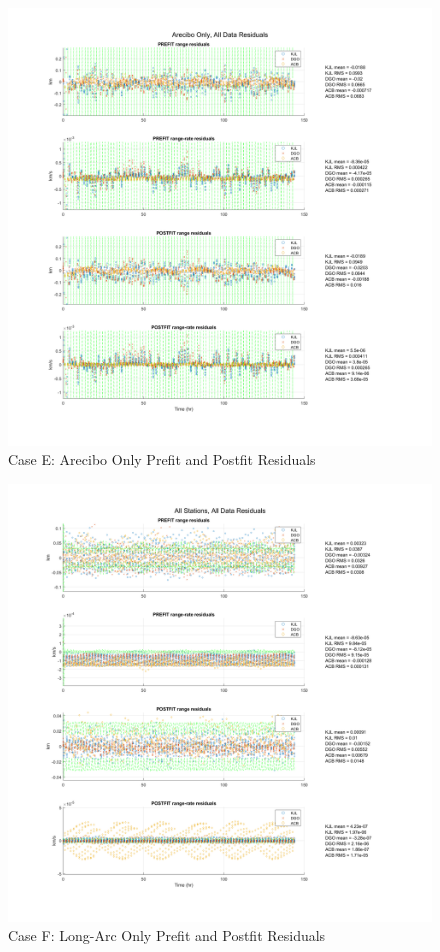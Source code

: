 \documentclass[conf]{new-aiaa}
\begin{document}
\begin{figure}[H]
\centering
\includegraphics[width=\textwidth]{caseE_res.png}
\caption{Case E: Arecibo Only Prefit and Postfit Residuals}
\end{figure}

\begin{figure}[H]
\centering
\includegraphics[width=\textwidth]{caseF_res.png}
\caption{Case F: Long-Arc Only Prefit and Postfit Residuals}
\end{figure}
\end{document}
